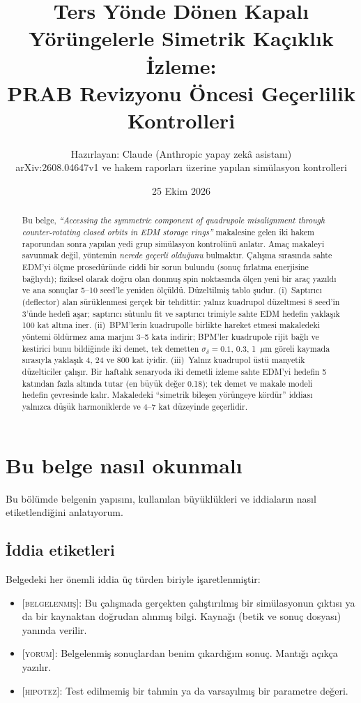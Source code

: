 \documentclass[11pt,a4paper]{article}
\title{Ters Yönde Dönen Kapalı Yörüngelerle Simetrik Kaçıklık İzleme:\\
PRAB Revizyonu Öncesi Geçerlilik Kontrolleri}
\author{Hazırlayan: Claude (Anthropic yapay zekâ asistanı)\\
\small arXiv:2608.04647v1 ve hakem raporları üzerine yapılan simülasyon kontrolleri}
\date{25 Ekim 2026}
\newcommand{\BEL}{\textsc{[belgelenmiş]}}
\newcommand{\YOR}{\textsc{[yorum]}}
\newcommand{\HIP}{\textsc{[hipotez]}}
\begin{document}
\maketitle

\begin{abstract}
\noindent Bu belge, \emph{``Accessing the symmetric component of quadrupole misalignment through
counter-rotating closed orbits in EDM storage rings''} makalesine gelen iki hakem raporundan sonra yapılan
yedi grup simülasyon kontrolünü anlatır. Amaç makaleyi savunmak değil, yöntemin \emph{nerede geçerli
olduğunu} bulmaktır. Çalışma sırasında sahte EDM'yi ölçme prosedüründe ciddi bir sorun bulundu (sonuç
fırlatma enerjisine bağlıydı); fiziksel olarak doğru olan donmuş spin noktasında ölçen yeni bir araç
yazıldı ve ana sonuçlar 5--10 seed'le yeniden ölçüldü. Düzeltilmiş tablo şudur. (i)~Saptırıcı
(deflector) alan sürüklenmesi gerçek bir tehdittir: yalnız kuadrupol düzeltmesi 8 seed'in 3'ünde hedefi
aşar; saptırıcı sütunlu fit ve saptırıcı trimiyle sahte EDM hedefin yaklaşık 100 kat altına iner.
(ii)~BPM'lerin kuadrupolle birlikte hareket etmesi makaledeki yöntemi öldürmez ama marjını 3--5 kata
indirir; BPM'ler kuadrupole rijit bağlı ve kestirici bunu bildiğinde iki demet, tek demetten
$\sigma_\delta=0.1$, 0.3, 1~$\mu$m göreli kaymada sırasıyla yaklaşık 4, 24 ve 800 kat iyidir.
(iii)~Yalnız kuadrupol üstü manyetik düzelticiler çalışır. Bir haftalık senaryoda iki demetli izleme
sahte EDM'yi hedefin 5 katından fazla altında tutar (en büyük değer 0.18); tek demet ve makale modeli
hedefin çevresinde kalır. Makaledeki ``simetrik bileşen yörüngeye kördür'' iddiası yalnızca düşük
harmoniklerde ve 4--7 kat düzeyinde geçerlidir.
\end{abstract}

\tableofcontents
\newpage

\section{Bu belge nasıl okunmalı}

Bu bölümde belgenin yapısını, kullanılan büyüklükleri ve iddiaların nasıl etiketlendiğini anlatıyorum.

\subsection{İddia etiketleri}
Belgedeki her önemli iddia üç türden biriyle işaretlenmiştir:
\begin{itemize}
\item \BEL: Bu çalışmada gerçekten çalıştırılmış bir simülasyonun çıktısı ya da bir kaynaktan doğrudan
alınmış bilgi. Kaynağı (betik ve sonuç dosyası) yanında verilir.
\item \YOR: Belgelenmiş sonuçlardan benim çıkardığım sonuç. Mantığı açıkça yazılır.
\item \HIP: Test edilmemiş bir tahmin ya da varsayılmış bir parametre değeri.
\end{itemize}
\end{document}
